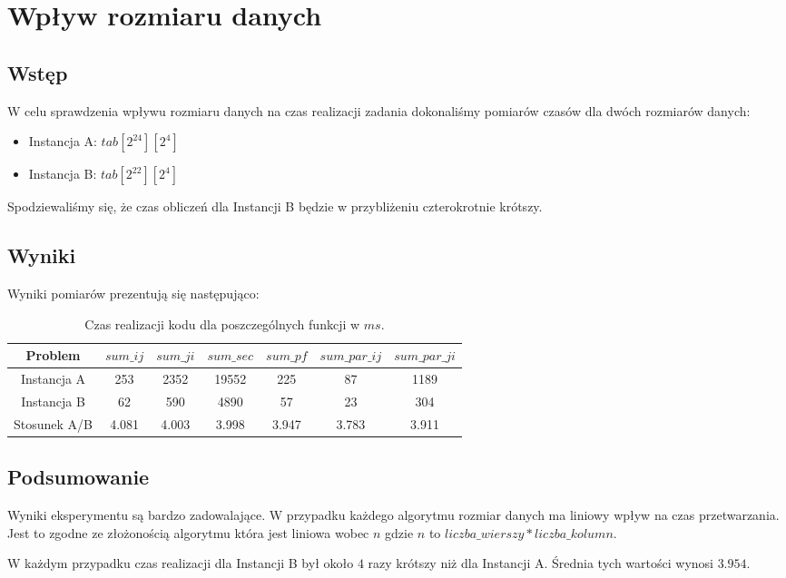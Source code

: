 \section{Wpływ rozmiaru danych}

\subsection{Wstęp}

W celu sprawdzenia wpływu rozmiaru danych na czas realizacji zadania dokonaliśmy pomiarów czasów dla dwóch rozmiarów danych:

\begin{itemize}
\item Instancja A: $tab[2^{24}][2^4]$
\item Instancja B: $tab[2^{22}][2^4]$
\end{itemize}

Spodziewaliśmy się, że czas obliczeń dla Instancji B będzie w przybliżeniu czterokrotnie krótszy.

\subsection{Wyniki}

Wyniki pomiarów prezentują się następująco:

\begin{table}[H]
\centering
\begin{tabular}{|c|c|c|c|c|c|c|}
\hline
Problem & $sum\_ij$ & $sum\_ji$ & $sum\_sec$ & $sum\_pf$ & $sum\_par\_ij$ & $sum\_par\_ji$ \\ \hline
Instancja A & 253 & 2352 & 19552 & 225 & 87 & 1189 \\ \hline
Instancja B & 62 & 590 & 4890 & 57 & 23 & 304 \\ \hline
Stosunek A/B & 4.081 & 4.003 & 3.998 & 3.947 & 3.783 & 3.911 \\ \hline
\end{tabular}
\caption{Czas realizacji kodu dla poszczególnych funkcji w $ms$.}
\end{table}

\subsection{Podsumowanie}

Wyniki eksperymentu są bardzo zadowalające. W przypadku każdego algorytmu rozmiar danych ma liniowy wpływ na czas przetwarzania. Jest to zgodne ze złożonością algorytmu która jest liniowa wobec $n$ gdzie $n$ to $liczba\_wierszy * liczba\_kolumn$.\newline

W każdym przypadku czas realizacji dla Instancji B był około $4$ razy krótszy niż dla Instancji A. Średnia tych wartości wynosi $3.954$.
